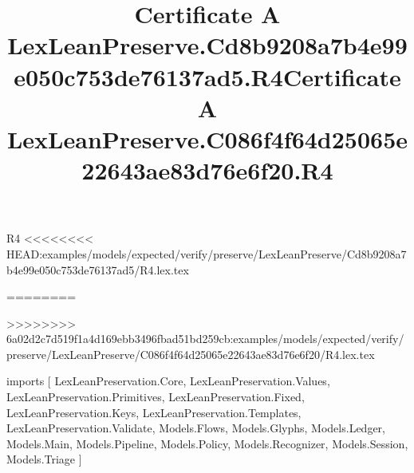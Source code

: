 \begin{lexlean}{R4}
<<<<<<<< HEAD:examples/models/expected/verify/preserve/LexLeanPreserve/Cd8b9208a7b4e99e050c753de76137ad5/R4.lex.tex
\title{Certificate A LexLeanPreserve.Cd8b9208a7b4e99e050c753de76137ad5.R4}
========
\title{Certificate A LexLeanPreserve.C086f4f64d25065e22643ae83d76e6f20.R4}
>>>>>>>> 6a02d2c7d519f1a4d169ebb3496fbad51bd259cb:examples/models/expected/verify/preserve/LexLeanPreserve/C086f4f64d25065e22643ae83d76e6f20/R4.lex.tex
\begin{coremodule}
imports [
  LexLeanPreservation.Core,
  LexLeanPreservation.Values,
  LexLeanPreservation.Primitives,
  LexLeanPreservation.Fixed,
  LexLeanPreservation.Keys,
  LexLeanPreservation.Templates,
  LexLeanPreservation.Validate,
  Models.Flows,
  Models.Glyphs,
  Models.Ledger,
  Models.Main,
  Models.Pipeline,
  Models.Policy,
  Models.Recognizer,
  Models.Session,
  Models.Triage
]


\end{coremodule}
\end{lexlean}

